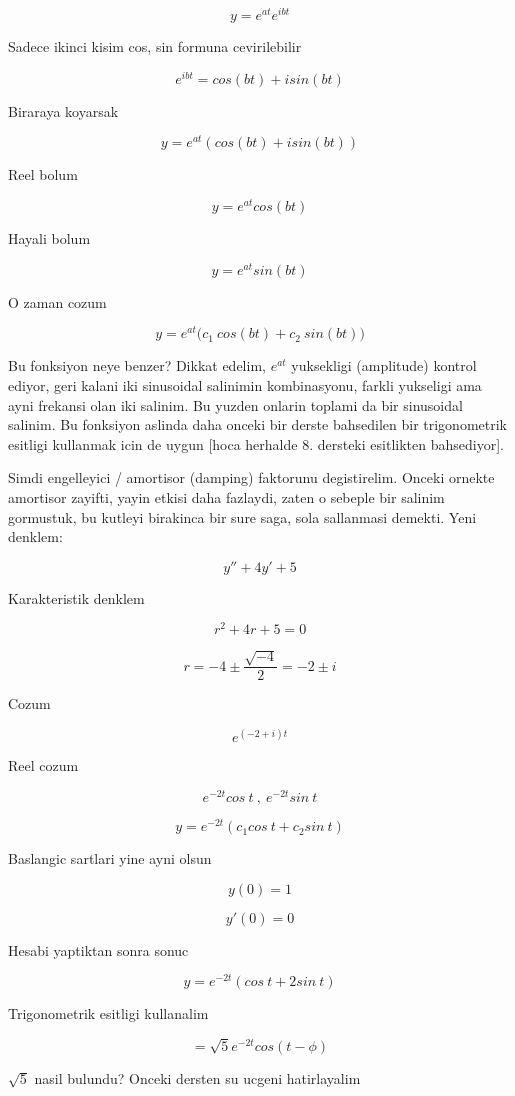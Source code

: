 \documentclass[12pt,fleqn]{article}
\begin{document}
\[ y = e^{at} e^{ibt} \]

Sadece ikinci kisim cos, sin formuna cevirilebilir

\[ e^{ibt} = cos(bt) + isin(bt) \]

Biraraya koyarsak

\[ y = e^{at} (cos(bt) + isin(bt)) \]

Reel bolum

\[ y = e^{at}cos(bt) \] 

Hayali bolum

\[ y = e^{at}sin(bt) \] 

O zaman cozum

\[ y = e^{at} \bigg( c_1 \ cos(bt) + c_2 \ sin(bt) \bigg) \]

Bu fonksiyon neye benzer? Dikkat edelim, $e^{at}$ yuksekligi (amplitude)
kontrol ediyor, geri kalani iki sinusoidal salinimin kombinasyonu, farkli
yukseligi ama ayni frekansi olan iki salinim. Bu yuzden onlarin toplami da
bir sinusoidal salinim. Bu fonksiyon aslinda daha onceki bir derste
bahsedilen bir trigonometrik esitligi kullanmak icin de uygun [hoca
herhalde 8. dersteki esitlikten bahsediyor].

Simdi engelleyici / amortisor (damping) faktorunu degistirelim. Onceki
ornekte amortisor zayifti, yayin etkisi daha fazlaydi, zaten o sebeple bir
salinim gormustuk, bu kutleyi birakinca bir sure saga, sola sallanmasi
demekti. Yeni denklem:

\[ y'' + 4y' + 5 \]

Karakteristik denklem

\[ r^2 + 4r + 5 = 0 \]

\[ r = -4 \pm \frac{\sqrt{-4}}{2} = -2 \pm i\]

Cozum

\[ e^{(-2+i)t} \]

Reel cozum

\[ e^{-2t}cos \ t \ , \ e^{-2t}sin \ t\]

\[ y = e^{-2t} (c_1 cos \ t + c_2 sin \ t) \]

Baslangic sartlari yine ayni olsun

\[ y(0) = 1 \]

\[ y'(0) = 0 \]

Hesabi yaptiktan sonra sonuc

\[ y = e^{-2t} (cos \ t + 2 sin \ t) \]

Trigonometrik esitligi kullanalim

\[ = \sqrt{5}e^{-2t} cos (t - \phi) \]

$\sqrt{5}$ nasil bulundu? Onceki dersten su ucgeni hatirlayalim
\end{document}
